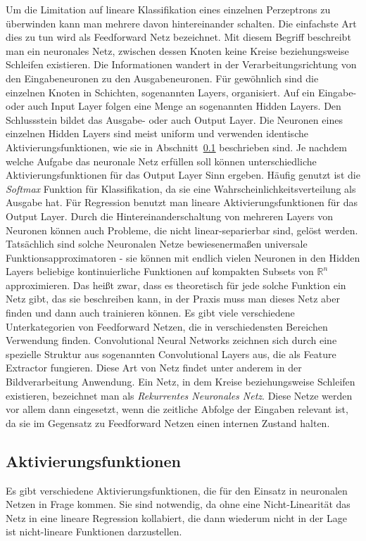 Um die Limitation auf lineare Klassifikation eines einzelnen Perzeptrons zu überwinden kann man mehrere davon hintereinander schalten. 
Die einfachste Art dies zu tun wird als Feedforward Netz bezeichnet.
Mit diesem Begriff beschreibt man ein neuronales Netz, zwischen dessen Knoten keine Kreise beziehungsweise Schleifen existieren.
Die Informationen wandert in der Verarbeitungsrichtung von den Eingabeneuronen zu den Ausgabeneuronen.
Für gewöhnlich sind die einzelnen Knoten in Schichten, sogenannten Layers, organisiert.
Auf ein Eingabe- oder auch Input Layer folgen eine Menge an sogenannten Hidden Layers.
Den Schlussstein bildet das Ausgabe- oder auch Output Layer.
Die Neuronen eines einzelnen Hidden Layers sind meist uniform und verwenden identische Aktivierungsfunktionen, wie sie in Abschnitt~\ref{sec:activationfuncs} beschrieben sind.
Je nachdem welche Aufgabe das neuronale Netz erfüllen soll können unterschiedliche Aktivierungsfunktionen für das Output Layer Sinn ergeben.
Häufig genutzt ist die \textit{Softmax} Funktion für Klassifikation, da sie eine Wahrscheinlichkeitsverteilung als Ausgabe hat.
Für Regression benutzt man lineare Aktivierungsfunktionen für das Output Layer. 
Durch die Hintereinanderschaltung von mehreren Layers von Neuronen können auch Probleme, die nicht linear-separierbar sind, gelöst werden.
Tatsächlich sind solche Neuronalen Netze bewiesenermaßen universale Funktionsapproximatoren - 
sie können mit endlich vielen Neuronen in den Hidden Layers beliebige kontinuierliche Funktionen auf kompakten Subsets von \(\mathbb{R}^n\) approximieren.
Das heißt zwar, dass es theoretisch für jede solche Funktion ein Netz gibt, das sie beschreiben kann, in der Praxis muss man dieses Netz aber finden und dann auch trainieren können.
Es gibt viele verschiedene Unterkategorien von Feedforward Netzen, die in verschiedensten Bereichen Verwendung finden.
Convolutional Neural Networks zeichnen sich durch eine spezielle Struktur aus sogenannten Convolutional Layers aus, die als Feature Extractor fungieren.
Diese Art von Netz findet unter anderem in der Bildverarbeitung Anwendung.
Ein Netz, in dem Kreise beziehungsweise Schleifen existieren, bezeichnet man als \textit{Rekurrentes Neuronales Netz}.
Diese Netze werden vor allem dann eingesetzt, wenn die zeitliche Abfolge der Eingaben relevant ist, 
da sie im Gegensatz zu Feedforward Netzen einen internen Zustand halten.

\subsection{Aktivierungsfunktionen}
\label{sec:activationfuncs}
Es gibt verschiedene Aktivierungsfunktionen, die für den Einsatz in neuronalen Netzen in Frage kommen.
Sie sind notwendig, da ohne eine Nicht-Linearität das Netz in eine lineare Regression kollabiert, 
die dann wiederum nicht in der Lage ist nicht-lineare Funktionen darzustellen.

